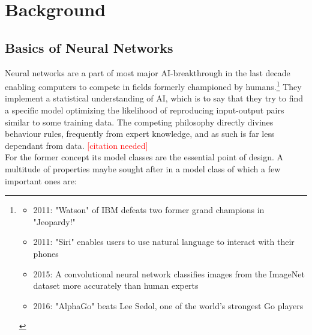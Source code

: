 \chapter{Background}
\label{ch:background}


\section{Basics of Neural Networks}
Neural networks are a part of most major AI-breakthrough in the last decade enabling computers to compete in fields formerly championed by humans.\footnote{\begin{itemize}
		\item 
			2011: "Watson" of IBM defeats two former grand champions in "Jeopardy!" \cite{lally2011natural}
		\item 
			2011: "Siri" enables users to use natural language to interact with their phones 
			\cite{ARON201124}
		\item 
			2015: A convolutional neural network classifies images from the ImageNet dataset more accurately than human experts 
			\cite{Russakovsky2015} \cite{He_2015_ICCV}
		\item 
			2016: "AlphaGo" beats Lee Sedol, one of the world's strongest Go players
			\cite{gibney2016google} \cite{silver2017mastering}
	\end{itemize}
}
They implement a statistical understanding of AI, which is to say that they try to find a specific model optimizing the likelihood of reproducing input-output pairs similar to some training data. The competing philosophy directly divines behaviour rules, frequently from expert knowledge, and as such is far less dependant from data.  
\textcolor{red}{[citation needed]}\\
For the former concept its model classes are the essential point of design. A multitude of properties maybe sought after in a model class of which a few important ones are:
